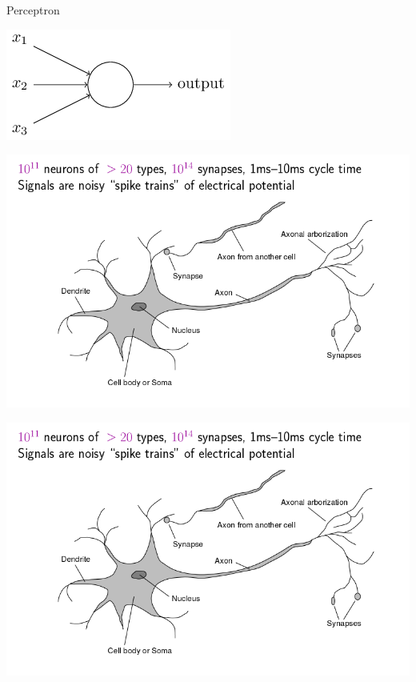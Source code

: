 \documentclass{beamer}
\begin{document}
\begin{frame}{Perceptron}
    \begin{center}
        \includegraphics[scale=0.4]{perceptron.png}
    \end{center}
\end{frame}
\begin{frame}{}
    \begin{center}
        \includegraphics[scale=0.4]{brains.png}
    \end{center}
\end{frame}
\begin{frame}{}
    \begin{center}
        \includegraphics[scale=0.4]{brains.png}
    \end{center}
\end{frame}
\end{document}

